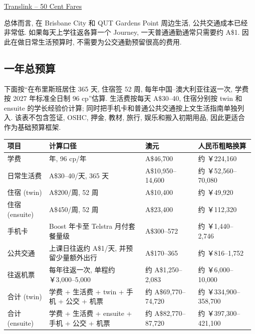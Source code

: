 \documentclass[UTF8,a4paper,12pt]{ctexart}
\newif\ifcourseopen
\newif\ifcourseheaderprinted
\newcounter{courseitem}
\newcommand{\finishcourse}{%
 \ifcourseopen
 \par\end{minipage}\end{tcolorbox}%
 \courseopenfalse
 \fi
}
\newcommand{\coursereset}{\finishcourse\setcounter{courseitem}{0}\courseheaderprintedfalse}
\newcommand{\official}[2]{\href{#1}{#2}}
\let\origsubsection\subsection
\renewcommand{\subsection}{\coursereset\origsubsection}
\begin{document}
\official{https://translink.com.au/tickets-and-fares/50-cent-fares}{Translink -- 50 Cent Fares}

总体而言, 在 Brisbane City 和 QUT Gardens Point 周边生活, 公共交通成本已经非常低. 如果每天上学往返各算一个 Journey, 一天普通通勤通常只需要约 A\$1. 因此在做日常生活预算时, 不需要为公交通勤预留很高的费用. 

\subsection{一年总预算}

下面按``在布里斯班居住 365 天, 住宿签 52 周, 每年中国--澳大利亚往返一次, 学费按 2027 年标准全日制 96 cp''估算. 生活费按每天 A\$30--40, 住宿分别按 twin 和 ensuite 的学长经验价计算; 同时把手机卡和普通公共交通按上文生活指南单独列入. 该表不包含签证, OSHC, 押金, 教材, 旅行, 娱乐和搬入初期用品, 因此更适合作为基础预算框架.

\scriptsize
\renewcommand{\arraystretch}{1.15}
\begin{longtable}{@{}>{\raggedright\arraybackslash}p{}>{\raggedright\arraybackslash}p{}>{\raggedright\arraybackslash}p{}>{\raggedright\arraybackslash}p{}@{}}
\toprule
项目 & 计算口径 & 澳元 & 人民币粗略换算\footnotemark \\
\midrule
\endhead
\bottomrule
\endfoot
学费 & 2027 年, 96 cp/年 & A\$46,700 & 约 ￥224,160 \\
日常生活费 & A\$30--40/天, 365 天 & A\$10,950--14,600 & 约 ￥52,560--70,080 \\
住宿 (twin) & A\$200/周, 52 周 & A\$10,400 & 约 ￥49,920 \\
住宿 (ensuite) & A\$450/周, 52 周 & A\$23,400 & 约 ￥112,320 \\
手机卡 & Boost 年卡至 Telstra 月付套餐量级 & A\$300--572 & 约 ￥1,440--2,746 \\
公共交通 & 上课日往返约 A\$1/天, 并预留少量额外出行 & A\$170--365 & 约 ￥816--1,752 \\
往返机票 & 每年往返一次, 单程约 ￥3,000--5,000 & 约 A\$1,250--2,083 & 约 ￥6,000--10,000 \\
\midrule
合计 (twin) & 学费 + 生活费 + twin + 手机 + 公交 + 机票 & 约 A\$69,770--74,720 & 约 ￥334,900--358,700 \\
合计 (ensuite) & 学费 + 生活费 + ensuite + 手机 + 公交 + 机票 & 约 A\$82,770--87,720 & 约 ￥397,300--421,100 \\
\end{longtable} 
\normalsize
\end{document}
